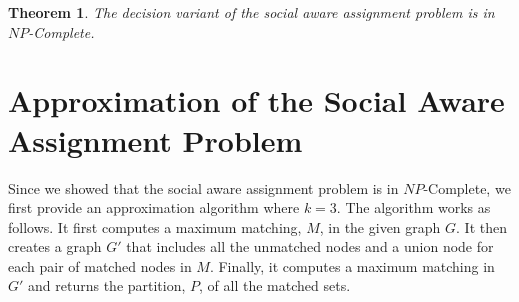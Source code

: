 \documentclass[letterpaper]{article} %
\newtheorem{theorem}{Theorem}
\begin{document}
\begin{theorem}
The decision variant of the social aware assignment problem is in $NP$-Complete.
\end{theorem}

\section{Approximation of the Social Aware Assignment Problem}
Since we showed that the social aware assignment problem is in $NP$-Complete, we first provide an approximation algorithm where $k=3$.
The algorithm works as follows. It first computes a maximum matching, $M$, in the given graph $G$. It then creates a graph $G'$ that includes all the unmatched nodes and a union node for each pair of matched nodes in $M$. Finally, it computes a maximum matching in $G'$ and returns the partition, $P$, of all the matched sets.

    
\end{document}
